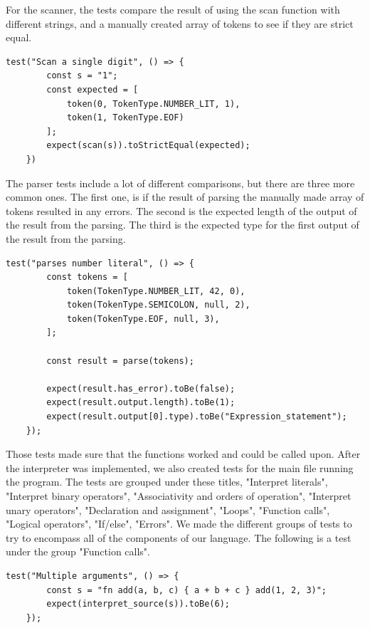 \documentclass[12pt,a4paper]{article}
\begin{document}
For the scanner, the tests compare the result of using the scan function with different strings, and a manually created array of tokens to see if they are strict equal. 

\begin{lstlisting}[title = Example of a scanner test]
test("Scan a single digit", () => {
        const s = "1";
        const expected = [
            token(0, TokenType.NUMBER_LIT, 1), 
            token(1, TokenType.EOF)
        ];
        expect(scan(s)).toStrictEqual(expected);
    })
\end{lstlisting}

The parser tests include a lot of different comparisons, but there are three more common ones. The first one, is if the result of parsing the manually made array of tokens resulted in any errors. The second is the expected length of the output of the result from the parsing. The third is the expected type for the first output of the result from the parsing.

\newpage
\begin{lstlisting}[title = Example of a parser test]
test("parses number literal", () => {
        const tokens = [
            token(TokenType.NUMBER_LIT, 42, 0),
            token(TokenType.SEMICOLON, null, 2),
            token(TokenType.EOF, null, 3),
        ];

        const result = parse(tokens);

        expect(result.has_error).toBe(false);
        expect(result.output.length).toBe(1);
        expect(result.output[0].type).toBe("Expression_statement");
    });
\end{lstlisting}

Those tests made sure that the functions worked and could be called upon. After the interpreter was implemented, we also created tests for the main file running the program. The tests are grouped under these titles, "Interpret literals", "Interpret binary operators", "Associativity and orders of operation", "Interpret unary operators", "Declaration and assignment", "Loops", "Function calls", "Logical operators", "If/else", "Errors". We made the different groups of tests to try to encompass all of the components of our language. The following is a test under the group "Function calls".

\newpage

\begin{lstlisting}[title = Example of a main test]
test("Multiple arguments", () => {
        const s = "fn add(a, b, c) { a + b + c } add(1, 2, 3)";
        expect(interpret_source(s)).toBe(6);
    });
\end{lstlisting}
\end{document}
